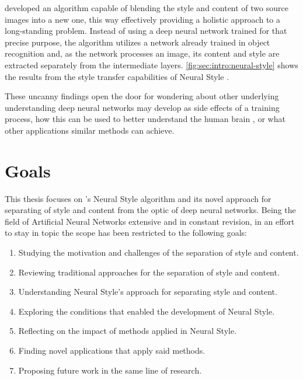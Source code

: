 \citeauthor{Gatys2015B} developed an algorithm capable of blending the style and content of two source images into a new one, this way effectively providing a holistic approach to a long-standing problem.
Instead of using a deep neural network trained for that precise purpose, the algorithm utilizes a network already trained in object recognition and, as the network processes an image, its content and style are extracted separately from the intermediate layers.
\autoref{fig:sec:intro:neural-style} shows the results from the style transfer capabilities of Neural Style \cite{Gatys2015B}.

These uncanny findings open the door for wondering about other underlying understanding deep neural networks may develop as side effects of a training process, how this can be used to better understand the human brain \cite{Yamins2016}, or what other applications similar methods can achieve.



\section{Goals}
\label{sec:intro:goals}

This thesis focuses on \citeauthor{Gatys2015B}'s Neural Style algorithm \cite{Gatys2015B} and its novel approach for separating of style and content from the optic of deep neural networks.
Being the field of Artificial Neural Networks extensive and in constant revision, in an effort to stay in topic the scope has been restricted to the following goals:

\begin{enumerate}
  \item Studying the motivation and challenges of the separation of style and content.
  \item Reviewing traditional approaches for the separation of style and content.
  \item Understanding Neural Style's approach for separating style and content.
  \item Exploring the conditions that enabled the development of Neural Style.
  \item Reflecting on the impact of methods applied in Neural Style.
  \item Finding novel applications that apply said methods.
  \item Proposing future work in the same line of research.
\end{enumerate}


